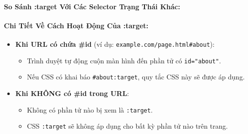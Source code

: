 \documentclass[11pt,oneside]{book}
\newcommand{\thd}[1]{\textcolor{white}{\textbf{\strut #1}}}
\newcommand{\codeinline}[1]{\textcolor{accentOrange}{\texttt{#1}}}
\begin{document}
\paragraph{So Sánh :target Với Các Selector Trạng Thái Khác:}

\begin{prettyTableBox}
\sffamily\small
{}
\end{prettyTableBox}

\paragraph{Chi Tiết Về Cách Hoạt Động Của :target:}

\begin{conceptBox}
\begin{itemize}[leftmargin=1.5em, itemsep=3pt, parsep=0pt]
    \item \textbf{Khi URL có chứa \#id} (ví dụ: \codeinline{example.com/page.html\#about}):
    \begin{itemize}[leftmargin=1.2em, itemsep=2pt]
        \item Trình duyệt tự động cuộn màn hình đến phần tử có \codeinline{id="about"}.
        \item Nếu CSS có khai báo \codeinline{\#about:target}, quy tắc CSS này sẽ được áp dụng.
    \end{itemize}
    \item \textbf{Khi KHÔNG có \#id trong URL}:
    \begin{itemize}[leftmargin=1.2em, itemsep=2pt]
        \item Không có phần tử nào bị xem là \codeinline{:target}.
        \item CSS \codeinline{:target} sẽ không áp dụng cho bất kỳ phần tử nào trên trang.
    \end{itemize}
\end{itemize}
\end{conceptBox}
\end{document}
